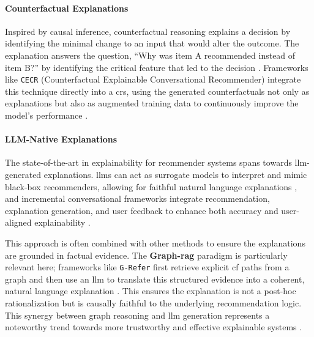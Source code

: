 \paragraph{Counterfactual Explanations}
Inspired by causal inference, counterfactual reasoning explains a decision by identifying the minimal change to an input that would alter the outcome. The explanation answers the question, ``Why was item A recommended instead of item B?'' by identifying the critical feature that led to the decision \cite{SOTA-COUNTERFACTUAL-EXP-REC}. Frameworks like \texttt{CECR} (Counterfactual Explainable Conversational Recommender) integrate this technique directly into a \ac{crs}, using the generated counterfactuals not only as explanations but also as augmented training data to continuously improve the model's performance \cite{SOTA-CECR}.

\paragraph{LLM-Native Explanations}
The state-of-the-art in explainability for reommender systems spans towards \ac{llm}-generated explanations. \acp{llm} can act as surrogate models to interpret and mimic black-box recommenders, allowing for faithful natural language explanations \cite{SOTA-LLM-REC-EXPLAIN}, and incremental conversational frameworks integrate recommendation, explanation generation, and user feedback to enhance both accuracy and user-aligned explainability \cite{TOWARDS-EXP-CRS}.

This approach is often combined with other methods to ensure the explanations are grounded in factual evidence. The \textbf{Graph-\ac{rag}} paradigm is particularly relevant here; frameworks like \texttt{G-Refer} first retrieve explicit \acl{cf} paths from a graph and then use an \ac{llm} to translate this structured evidence into a coherent, natural language explanation \cite{G-REFER}. This ensures the explanation is not a post-hoc rationalization but is causally faithful to the underlying recommendation logic. This synergy between graph reasoning and \ac{llm} generation represents a noteworthy trend towards more trustworthy and effective explainable systems \cite{SOTA-RECSYS-EXPLAIN-KG, SOTA-CRS-EXPLAIN}.